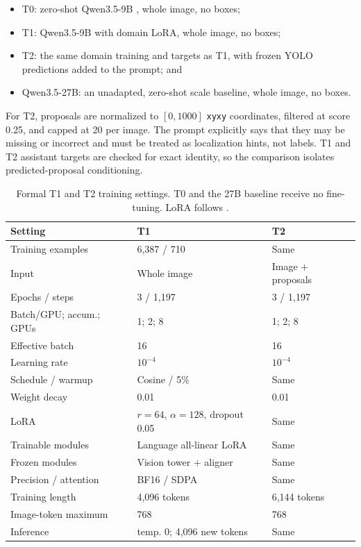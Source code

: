 \documentclass[11pt]{article}
\newcommand{\Tzero}{\textsc{T0}}
\newcommand{\Tone}{\textsc{T1}}
\newcommand{\Ttwo}{\textsc{T2}}
\begin{document}
\begin{itemize}[leftmargin=*,nosep]
    \item \Tzero: zero-shot Qwen3.5-9B \citep{qwen2026qwen35}, whole image, no boxes;
    \item \Tone: Qwen3.5-9B with domain LoRA, whole image, no boxes;
    \item \Ttwo: the same domain training and targets as \Tone, with frozen
    YOLO predictions added to the prompt; and
    \item Qwen3.5-27B: an unadapted, zero-shot scale baseline, whole image, no boxes.
\end{itemize}

For \Ttwo, proposals are normalized to $[0,1000]$ \texttt{xyxy} coordinates,
filtered at score 0.25, and capped at 20 per image. The prompt explicitly says
that they may be missing or incorrect and must be treated as localization hints,
not labels. T1 and T2 assistant targets are checked for exact identity, so the
comparison isolates predicted-proposal conditioning.

\begin{table}[H]
\centering
\scriptsize
\renewcommand{\arraystretch}{1.08}
\setlength{\tabcolsep}{2.5pt}
\begin{tabular}{p{2.25cm}p{2.15cm}p{2.15cm}}
\toprule
Setting & \Tone & \Ttwo \\
\midrule
Training examples & 6,387 / 710 & Same \\
Input & Whole image & Image + proposals \\
Epochs / steps & 3 / 1,197 & 3 / 1,197 \\
Batch/GPU; accum.; GPUs & 1; 2; 8 & 1; 2; 8 \\
Effective batch & 16 & 16 \\
Learning rate & $10^{-4}$ & $10^{-4}$ \\
Schedule / warmup & Cosine / 5\% & Same \\
Weight decay & 0.01 & 0.01 \\
LoRA & $r=64$, $\alpha=128$, dropout 0.05 & Same \\
Trainable modules & Language all-linear LoRA & Same \\
Frozen modules & Vision tower + aligner & Same \\
Precision / attention & BF16 / SDPA & Same \\
Training length & 4,096 tokens & 6,144 tokens \\
Image-token maximum & 768 & 768 \\
Inference & temp. 0; 4,096 new tokens & Same \\
\bottomrule
\end{tabular}
\caption{Formal T1 and T2 training settings. T0 and the 27B baseline receive no
fine-tuning. LoRA follows \citet{hu2022lora}.}
\label{tab:writer-settings}
\end{table}
\end{document}
